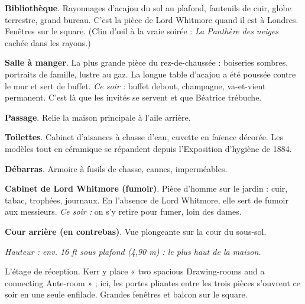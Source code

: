 \documentclass[10pt,a4paper]{article}
\newcommand{\niveau}[1]{\par\noindent{\color{accent}\fontsize{17}{20}\selectfont\itshape #1}\par\vspace{2pt}}
\begin{document}
\begin{minipage}[t]{8.95cm}
\begin{descr}
\item[\textbf{R7}] \textbf{Bibliothèque}. Rayonnages d'acajou du sol au plafond, fauteuils de cuir, globe terrestre, grand bureau. C'est la pièce de Lord Whitmore quand il est à Londres. Fenêtres sur le square. (Clin d'œil à la vraie soirée : \emph{La Panthère des neiges} cachée dans les rayons.)
\item[\textbf{R8}] \textbf{Salle à manger}. La plus grande pièce du rez-de-chaussée : boiseries sombres, portraits de famille, lustre au gaz. La longue table d'acajou a été poussée contre le mur et sert de buffet. \textit{Ce soir :} buffet debout, champagne, va-et-vient permanent. C'est là que les invités se servent et que Béatrice trébuche.
\item[\textbf{R9}] \textbf{Passage}. Relie la maison principale à l'aile arrière.
\item[\textbf{R10}] \textbf{Toilettes}. Cabinet d'aisances à chasse d'eau, cuvette en faïence décorée. Les modèles tout en céramique se répandent depuis l'Exposition d'hygiène de 1884.
\item[\textbf{R11}] \textbf{Débarras}. Armoire à fusils de chasse, cannes, imperméables.
\item[\textbf{R12}] \textbf{Cabinet de Lord Whitmore (fumoir)}. Pièce d'homme sur le jardin : cuir, tabac, trophées, journaux. En l'absence de Lord Whitmore, elle sert de fumoir aux messieurs. \textit{Ce soir :} on s'y retire pour fumer, loin des dames.
\item[\textbf{R13}] \textbf{Cour arrière (en contrebas)}. Vue plongeante sur la cour du sous-sol.
\end{descr}
\end{minipage}
\newpage
\niveau{Premier étage — l'étage noble}
{\small\textit{Hauteur : env. 16 ft sous plafond (4,90 m) : le plus haut de la maison.}}\par
{\small L'étage de réception. Kerr y place « two spacious Drawing-rooms and a connecting Ante-room » ; ici, les portes pliantes entre les trois pièces s'ouvrent ce soir en une seule enfilade. Grandes fenêtres et balcon sur le square.}\par\vspace{4pt}
\end{document}
